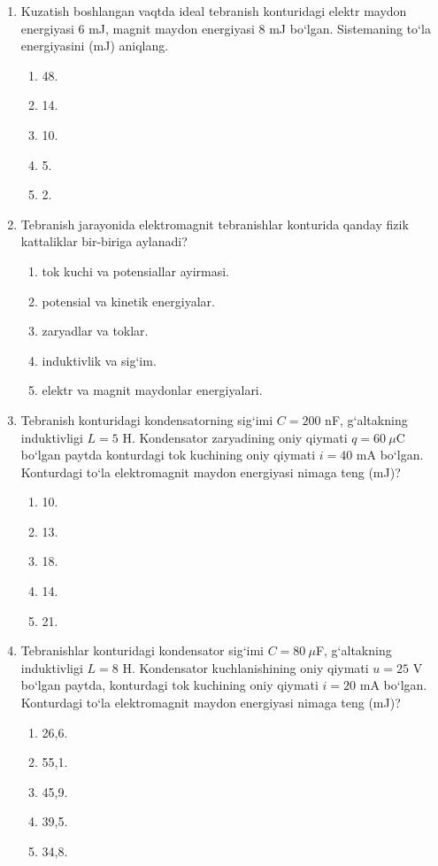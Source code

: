\begin{enumerate}

\item Kuzatish boshlangan vaqtda ideal tebranish konturidagi elektr maydon energiyasi $6$ mJ, magnit maydon energiyasi $8$ mJ bo‘lgan. Sistemaning to‘la energiyasini (mJ) aniqlang.
\begin{enumerate}[label=\Alph*)]
\item 48.
\item 14.
\item 10.
\item 5.
\item 2.
\end{enumerate}

\item Tebranish jarayonida elektromagnit tebranishlar konturida qanday fizik kattaliklar bir-biriga aylanadi?
\begin{enumerate}[label=\Alph*)]
\item tok kuchi va potensiallar ayirmasi.
\item potensial va kinetik energiyalar.
\item zaryadlar va toklar.
\item induktivlik va sig‘im.
\item elektr va magnit maydonlar energiyalari.
\end{enumerate}

\item Tebranish konturidagi kondensatorning sig‘imi $C=200$ nF, g‘altakning induktivligi $L=5$ H. Kondensator zaryadining oniy qiymati $q=60~\mu$C bo‘lgan paytda konturdagi tok kuchining oniy qiymati $i=40$ mA bo‘lgan. Konturdagi to‘la elektromagnit maydon energiyasi nimaga teng (mJ)?
\begin{enumerate}[label=\Alph*)]
\item 10.
\item 13.
\item 18.
\item 14.
\item 21.
\end{enumerate}

\item Tebranishlar konturidagi kondensator sig‘imi $C=80~\mu$F, g‘altakning induktivligi $L=8$ H. Kondensator kuchlanishining oniy qiymati $u=25$ V bo‘lgan paytda, konturdagi tok kuchining oniy qiymati $i=20$ mA bo‘lgan. Konturdagi to‘la elektromagnit maydon energiyasi nimaga teng (mJ)?
\begin{enumerate}[label=\Alph*)]
\item 26,6.
\item 55,1.
\item 45,9.
\item 39,5.
\item 34,8.
\end{enumerate}


\end{enumerate}
